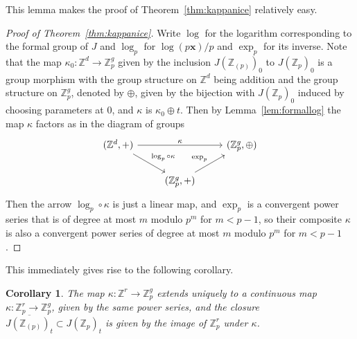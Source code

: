 \documentclass[12pt]{article}
\newcommand{\Z}{\mathbb{Z}}
\newcommand{\vx}{\mathbf{x}}
\theoremstyle{plain}
\newtheorem{cor}[thm]{Corollary} %
\theoremstyle{definition}
\theoremstyle{remark}
\begin{document}
This lemma makes the proof of Theorem~\ref{thm:kappanice} relatively easy. 
\begin{proof}[Proof of Theorem~\ref{thm:kappanice}]
Write $\log$ for the logarithm corresponding to the formal group of $J$ and $\log_p$ for $\log(p\vx)/p$ and $\exp_p$ for its inverse. Note that the map $\kappa_0: \Z^d \to \Z_p^g$ given by the inclusion $J(\Z_{(p)})_0$ to $J(\Z_p)_0$ is a group morphism with the group structure on $\Z^d$ being addition and the group structure on $\Z_p^g$, denoted by $\oplus$, given by the bijection with $J(\Z_p)_0$ induced by choosing parameters at $0$, and $\kappa$ is $\kappa_0 \oplus t$. Then by Lemma~\ref{lem:formallog} the map $\kappa$ factors as in the diagram of groups
\[
\begin{tikzcd}
{(\Z^d,+)} \arrow[rr, "\kappa"] \arrow[rd, "\log_p \circ \kappa"] &                                   & {(\Z_p^g,\oplus)} \\
                                                                  & {(\Z_p^g,+)} \arrow[ru, "\exp_p"] &                  
\end{tikzcd}
\]
Then the arrow $\log_p \circ \kappa$ is just a linear map, and $\exp_p$ is a convergent power series that is of degree at most $m$ modulo $p^m$ for $m < p-1$, so their composite $\kappa$ is also a convergent power series of degree at most $m$ modulo $p^m$ for $m < p-1$.
\end{proof}

This immediately gives rise to the following corollary.
\begin{cor}
\label{cor:closurejac}
The map $\kappa: \Z^r \to \Z_p^g$ extends uniquely to a continuous map $\kappa: \Z_p^r \to \Z_p^g$, given by the same power series, and the closure $\overline{J(\Z_{(p)})_t} \subset J(\Z_p)_t$ is given by the image of $\Z_p^r$ under $\kappa$.
\end{cor}
\end{document}
